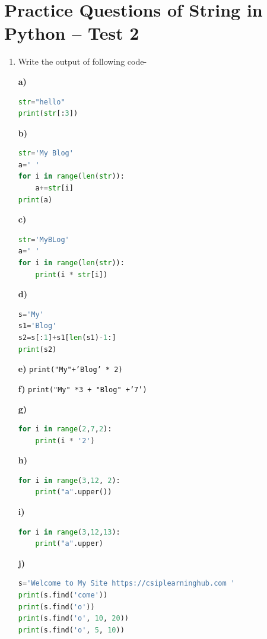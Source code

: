 \documentclass[12pt,a4paper]{article}
\begin{document}
\section{Practice Questions of String in Python -- Test 2}

\begin{enumerate}[label=\textbf{Q\arabic*.}]

\item Write the output of following code- 

\textbf{a)}
\begin{lstlisting}[language=Python]
str="hello"
print(str[:3])
\end{lstlisting}

\textbf{b)}
\begin{lstlisting}[language=Python]
str='My Blog'
a=' '
for i in range(len(str)):
    a+=str[i]
print(a)
\end{lstlisting}

\textbf{c)}
\begin{lstlisting}[language=Python]
str='MyBLog'
a=' '
for i in range(len(str)):
    print(i * str[i])
\end{lstlisting}

\textbf{d)}
\begin{lstlisting}[language=Python]
s='My'
s1='Blog'
s2=s[:1]+s1[len(s1)-1:]
print(s2)
\end{lstlisting}

\textbf{e)} \texttt{print("My"+'Blog' * 2)}

\textbf{f)} \texttt{print("My" *3 + "Blog" +'7')}

\textbf{g)}
\begin{lstlisting}[language=Python]
for i in range(2,7,2):
    print(i * '2')
\end{lstlisting}

\textbf{h)}
\begin{lstlisting}[language=Python]
for i in range(3,12, 2):
    print("a".upper())
\end{lstlisting}

\textbf{i)}
\begin{lstlisting}[language=Python]
for i in range(3,12,13):
    print("a".upper)
\end{lstlisting}

\textbf{j)}
\begin{lstlisting}[language=Python]
s='Welcome to My Site https://csiplearninghub.com '
print(s.find('come'))
print(s.find('o'))
print(s.find('o', 10, 20))
print(s.find('o', 5, 10))
\end{lstlisting}

\end{enumerate}
\end{document}
